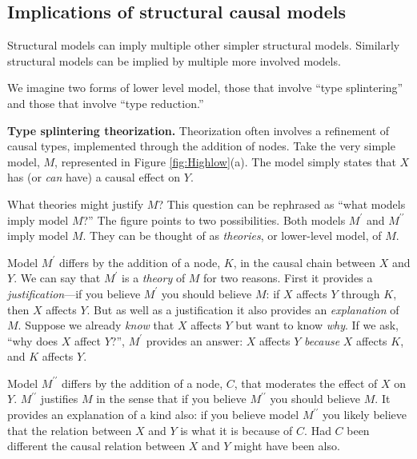 \documentclass[
  12pt,
]{book}
\begin{document}
\hypertarget{implications-of-structural-causal-models}{%
\subsection{Implications of structural causal models}\label{implications-of-structural-causal-models}}

Structural models can imply multiple other simpler structural models. Similarly structural models can be implied by multiple more involved models.

We imagine two forms of lower level model, those that involve ``type splintering'' and those that involve ``type reduction.''

\textbf{Type splintering theorization.} Theorization often involves a refinement of causal types, implemented through the addition of nodes.
Take the very simple model, \(M\), represented in Figure \ref{fig:Highlow}(a). The model simply states that \(X\) has (or \emph{can} have) a causal effect on \(Y\).

What theories might justify \(M\)? This question can be rephrased as ``what models imply model \(M\)?'' The figure points to two possibilities. Both models \(M^\prime\) and \(M^{\prime\prime}\) imply model \(M\). They can be thought of as \emph{theories}, or lower-level model, of \(M\).

Model \(M^\prime\) differs by the addition of a node, \(K\), in the causal chain between \(X\) and \(Y\). We can say that \(M^\prime\) is a \emph{theory} of \(M\) for two reasons. First it provides a \emph{justification}---if you believe \(M^\prime\) you should believe \(M\): if \(X\) affects \(Y\) through \(K\), then \(X\) affects \(Y\). But as well as a justification it also provides an \emph{explanation} of \(M\). Suppose we already \emph{know} that \(X\) affects \(Y\) but want to know \emph{why}. If we ask, ``why does \(X\) affect \(Y\)?'', \(M^\prime\) provides an answer: \(X\) affects \(Y\) \emph{because} \(X\) affects \(K\), and \(K\) affects \(Y\).

Model \(M^{\prime\prime}\) differs by the addition of a node, \(C\), that moderates the effect of \(X\) on \(Y\). \(M^{\prime\prime}\) justifies \(M\) in the sense that if you believe \(M^{\prime\prime}\) you should believe \(M\). It provides an explanation of a kind also: if you believe model \(M^{\prime\prime}\) you likely believe that the relation between \(X\) and \(Y\) is what it is because of \(C\). Had \(C\) been different the causal relation between \(X\) and \(Y\) might have been also.
\end{document}
